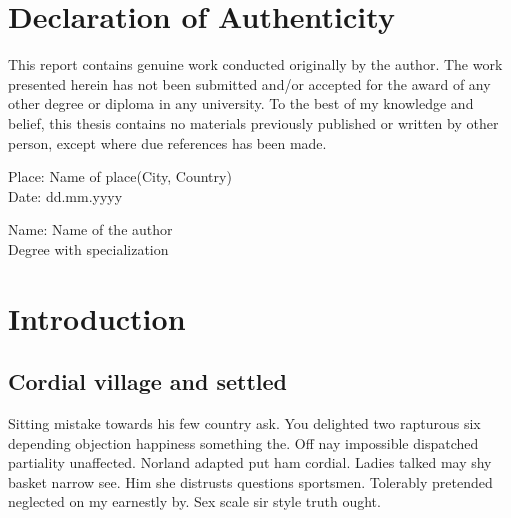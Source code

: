 \documentclass[12pt]{report}
\begin{document}
\section*{Declaration of Authenticity}
This report contains genuine work conducted originally by the author. The work presented herein has not been submitted and/or accepted for the award of any other degree or diploma in any university. To the best of my knowledge and belief, this thesis contains no materials previously published or written by other person, except where due references has been made.\cite{benner_2003}
\vfill
\begin{minipage}{.45\linewidth}
\begin{flushleft}  
        \vspace{1.0cm}
        Place: Name of place(City, Country)\\
        Date: dd.mm.yyyy
        \end{flushleft}
\end{minipage}
  \hfill
\begin{minipage}{.45\linewidth} %
\begin{flushright} 
        \vspace{1.0cm}
        Name: Name of the author\\
        Degree with specialization
        \end{flushright}
\end{minipage}
\newpage
\fancyfoot[L]{\rightmark}

\section{Introduction} 

\subsection{Cordial village and settled} 
Sitting mistake towards his few country ask. You delighted two rapturous six depending objection happiness something the. Off nay impossible dispatched partiality unaffected. Norland adapted put ham cordial. Ladies talked may shy basket narrow see. Him she distrusts questions sportsmen. Tolerably pretended neglected on my earnestly by. Sex scale sir style truth ought. 
\end{document}
